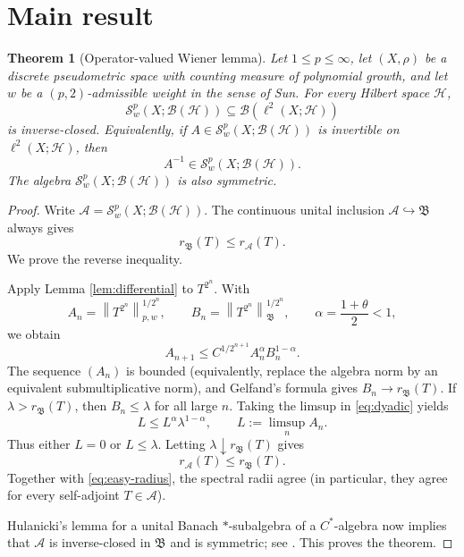 \documentclass[11pt]{article}
\newtheorem{theorem}{Theorem}
\newcommand{\BH}{\mathcal B(\mathcal H)}
\newcommand{\BB}{\mathfrak B}
\newcommand{\Spw}{\mathcal S^p_w}
\newcommand{\norm}[1]{\left\lVert #1\right\rVert}
\newcommand{\snorm}[2]{\left\lVert #1\right\rVert_{#2}}
\newcommand{\rad}{r}
\begin{document}
\section*{Main result}

\begin{theorem}[Operator-valued Wiener lemma]\label{thm:main}
Let $1\le p\le\infty$, let $(X,\rho)$ be a discrete pseudometric space with
counting measure of polynomial growth, and let $w$ be a $(p,2)$-admissible
weight in the sense of Sun.  For every Hilbert space $\mathcal H$,
\[
 \mathcal S^p_w(X;\BH)
 \subseteq \mathcal B(\ell^2(X;\mathcal H))
\]
is inverse-closed.  Equivalently, if $A\in\mathcal S^p_w(X;\BH)$ is
invertible on $\ell^2(X;\mathcal H)$, then
\[
        A^{-1}\in\mathcal S^p_w(X;\BH).
\]
The algebra $\mathcal S^p_w(X;\BH)$ is also symmetric.
\end{theorem}

\begin{proof}
Write $\mathcal A=\Spw(X;\BH)$.  The continuous unital inclusion
$\mathcal A\hookrightarrow\BB$ always gives
\begin{equation}
        \rad_{\BB}(T)\le\rad_{\mathcal A}(T).            \label{eq:easy-radius}
\end{equation}
We prove the reverse inequality.

Apply Lemma \ref{lem:differential} to $T^{2^n}$.  With
\[
 A_n=\snorm{T^{2^n}}{p,w}^{1/2^n},
 \qquad
 B_n=\norm{T^{2^n}}_{\BB}^{1/2^n},
 \qquad
 \alpha=\frac{1+\theta}{2}<1,
\]
we obtain
\begin{equation}
 A_{n+1}
 \le C^{1/2^{n+1}} A_n^\alpha B_n^{1-\alpha}.           \label{eq:dyadic}
\end{equation}
The sequence $(A_n)$ is bounded (equivalently, replace the algebra norm by
an equivalent submultiplicative norm), and Gelfand's formula gives
$B_n\to\rad_{\BB}(T)$.  If $\lambda>\rad_{\BB}(T)$, then $B_n\le\lambda$
for all large $n$.  Taking the limsup in \eqref{eq:dyadic} yields
\[
 L\le L^\alpha\lambda^{1-\alpha},
 \qquad L:=\limsup_n A_n.
\]
Thus either $L=0$ or $L\le\lambda$.  Letting
$\lambda\downarrow\rad_{\BB}(T)$ gives
\[
        \rad_{\mathcal A}(T)\le\rad_{\BB}(T).
\]
Together with \eqref{eq:easy-radius}, the spectral radii agree (in
particular, they agree for every self-adjoint $T\in\mathcal A$).

Hulanicki's lemma for a unital Banach $*$-subalgebra of a $C^*$-algebra now
implies that $\mathcal A$ is inverse-closed in $\BB$ and is symmetric; see
\cite[Proposition 2.1]{KB}.  This proves the theorem.
\end{proof}
\end{document}
